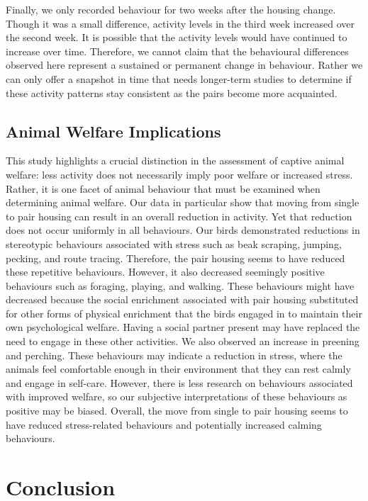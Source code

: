 \documentclass[
  pub]{apa6}
\begin{document}
Finally, we only recorded behaviour for two weeks after the housing change. Though it was a small difference, activity levels in the third week increased over the second week. It is possible that the activity levels would have continued to increase over time. Therefore, we cannot claim that the behavioural differences observed here represent a sustained or permanent change in behaviour. Rather we can only offer a snapshot in time that needs longer-term studies to determine if these activity patterns stay consistent as the pairs become more acquainted.

\subsection{Animal Welfare Implications}\label{animal-welfare-implications}

This study highlights a crucial distinction in the assessment of captive animal welfare: less activity does not necessarily imply poor welfare or increased stress. Rather, it is one facet of animal behaviour that must be examined when determining animal welfare. Our data in particular show that moving from single to pair housing can result in an overall reduction in activity. Yet that reduction does not occur uniformly in all behaviours. Our birds demonstrated reductions in stereotypic behaviours associated with stress such as beak scraping, jumping, pecking, and route tracing. Therefore, the pair housing seems to have reduced these repetitive behaviours. However, it also decreased seemingly positive behaviours such as foraging, playing, and walking. These behaviours might have decreased because the social enrichment associated with pair housing substituted for other forms of physical enrichment that the birds engaged in to maintain their own psychological welfare. Having a social partner present may have replaced the need to engage in these other activities. We also observed an increase in preening and perching. These behaviours may indicate a reduction in stress, where the animals feel comfortable enough in their environment that they can rest calmly and engage in self-care. However, there is less research on behaviours associated with improved welfare, so our subjective interpretations of these behaviours as positive may be biased. Overall, the move from single to pair housing seems to have reduced stress-related behaviours and potentially increased calming behaviours.

\section{Conclusion}\label{conclusion}
\end{document}
